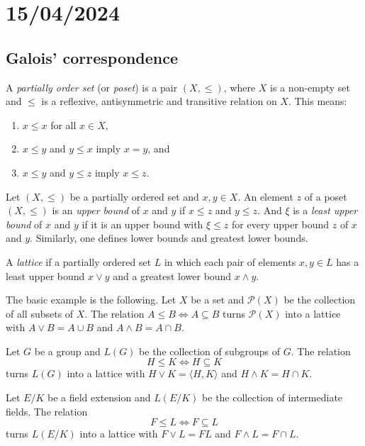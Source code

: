 \section{15/04/2024}

\subsection{Galois' correspondence}

A \emph{partially order set} (or \emph{poset}) is a pair $(X,\leq)$, where $X$ is a non-empty set
and $\leq$ is a reflexive, antisymmetric and transitive relation on $X$. This means:
\begin{enumerate}
    \item $x\leq x$ for all $x\in X$, 
    \item $x\leq y$ and $y\leq x$ imply $x=y$, and 
    \item $x\leq y$ and $y\leq z$ imply $x\leq z$. 
\end{enumerate}
Let $(X,\leq)$ be a partially ordered set and $x,y\in X$. 
An element $z$ of a poset $(X,\leq)$ is an \emph{upper bound} of $x$ and $y$ if 
$x\leq z$ and $y\leq z$. And $\xi$ 
is a \emph{least upper bound} of $x$ and $y$ 
if it is an upper bound with $\xi\leq z$ for every upper bound $z$ of $x$ and $y$. 
Similarly, one defines lower bounds and greatest lower bounds. 

\begin{definition}
    A \emph{lattice} if a partially ordered set $L$ in which 
    each pair of elements $x,y\in L$ has a least upper bound $x\vee y$ and a
    greatest lower bound $x\wedge y$. 
\end{definition}

The basic example is the following. 
Let $X$ be a set and $\mathcal{P}(X)$ be the collection of all subsets of $X$. The relation 
$A\leq B\Longleftrightarrow A\subseteq B$
turns $\mathcal{P}(X)$ into a lattice 
with $A\vee B=A\cup B$ and $A\wedge B=A\cap B$. 

\begin{example}
    Let $G$ be a group and $L(G)$ be the collection of subgroups of $G$. The relation
    \[ 
    H\leq K\Longleftrightarrow H\subseteq K
    \] 
    turns $L(G)$ into a lattice 
    with $H\vee K=\langle H,K\rangle$ and 
    $H\wedge K=H\cap K$. 
\end{example}

\begin{example}
    Let $E/K$ be a field extension and $L(E/K)$ be the collection of 
    intermediate fields. The relation
    \[
    F\leq L\Longleftrightarrow F\subseteq L
    \]
    turns $L(E/K)$ into a lattice with 
    $F\vee L=FL$ and $F\wedge L=F\cap L$. 
\end{example}

